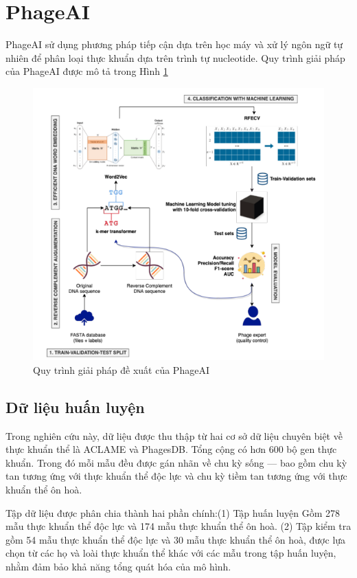 \section{PhageAI}
PhageAI\cite{tynecki2020phageai} sử dụng phương pháp tiếp cận dựa trên học máy và xử lý ngôn ngữ tự nhiên để phân loại thực khuẩn dựa trên trình tự nucleotide. Quy trình giải pháp của PhageAI được mô tả trong Hình \ref{fig:phageai}
\begin{figure}[ht]
    \centering
    \includegraphics[width=0.8\linewidth]{figures/phageai.png}
    \caption{Quy trình giải pháp đề xuất của PhageAI}
    \label{fig:phageai}
\end{figure}

\subsection*{Dữ liệu huấn luyện}
Trong nghiên cứu này, dữ liệu được thu thập từ hai cơ sở dữ liệu chuyên biệt về thực khuẩn thể là ACLAME và PhagesDB. Tổng cộng có hơn 600 bộ gen thực khuẩn. Trong đó mỗi mẫu đều được gán nhãn về chu kỳ sống — bao gồm chu kỳ tan tương ứng với thực khuẩn thể độc lực và chu kỳ tiềm tan tương ứng với thực khuẩn thể ôn hoà.

Tập dữ liệu được phân chia thành hai phần chính:(1) Tập huấn luyện Gồm 278 mẫu thực khuẩn thể độc lực và 174 mẫu thực khuẩn thể ôn hoà. (2) Tập kiểm tra gồm 54 mẫu thực khuẩn thể độc lực và 30 mẫu thực khuẩn thể ôn hoà, được lựa chọn từ các họ và loài thực khuẩn thể khác với các mẫu trong tập huấn luyện, nhằm đảm bảo khả năng tổng quát hóa của mô hình.


